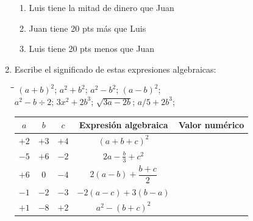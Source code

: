 \documentclass[10pt,twoside]{article}
\begin{document}
\begin{enumerate}
\begin{enumerate}
\item Luis tiene la mitad de dinero que Juan
\item Juan tiene 20 pts más que Luis
\item Luis tiene 20 pts menos que Juan
\end{enumerate}
\item Escribe el significado de estas expresiones algebraicas:
\begin{tabbing}
\hspace{2.5cm}\=\hspace{2.5cm}\=\hspace{2.5cm}\=\kill
$(a+b)^{2}$; \> $a^{2}+b^{2}$; \> $a^{2}-b^{2}$; \> $(a-b)^{2}$; \\ 
$a^{2}-b\div 2$; \> $3x^{2}+2b^{3}$; \> $\sqrt{3a-2b}$; \> $a/5+2b^{3}$; 
\end{tabbing} 
\begin{tabular}{|c|c|c|c|c|}
\hline 
$a$ & $b$ & $c$ & Expresión algebraica & Valor numérico \rule[-0.3cm]{0cm}{0.8cm}
 \\ 
\hline 
$+2$ & $+3$ & $+4$ & $(a+b+c)^{2}$ & \rule[-0.3cm]{0cm}{0.8cm}
 \\ 
\hline 
$-5$ & $+6$ & $-2$ & $2a-\frac{b}{3}+c^{2}$ & \rule[-0.3cm]{0cm}{0.8cm}
 \\ 
\hline 
$+6$ & 0 & $-4$ & $2(a-b)+\dfrac{b+c}{2}$ & \rule[-0.3cm]{0cm}{0.8cm}
 \\ 
\hline 
$-1$ & $-2$ & $-3$ & $-2(a-c)+3(b-a)$ &  \\ 
\hline 
$+1$ & $-8$ & $+2$ & $a^{2}-(b+c)^{2}$ &  \\ 
\hline 
\end{tabular} 
\end{enumerate}
\end{document}
